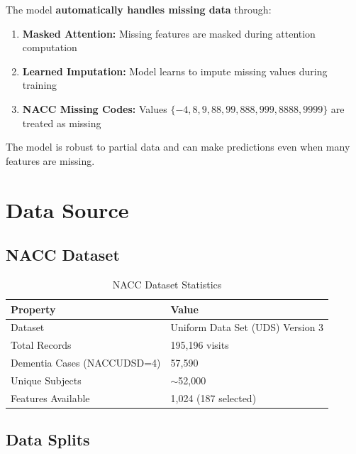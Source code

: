 \documentclass[11pt,a4paper]{article}
\begin{document}
\begin{tcolorbox}[colback=green!5!white, colframe=green!75!black, title=Automatic Missing Data Imputation]
The model \textbf{automatically handles missing data} through:
\begin{enumerate}
    \item \textbf{Masked Attention:} Missing features are masked during attention computation
    \item \textbf{Learned Imputation:} Model learns to impute missing values during training
    \item \textbf{NACC Missing Codes:} Values $\{-4, 8, 9, 88, 99, 888, 999, 8888, 9999\}$ are treated as missing
\end{enumerate}
The model is robust to partial data and can make predictions even when many features are missing.
\end{tcolorbox}

\section{Data Source}

\subsection{NACC Dataset}

\begin{table}[H]
\centering
\caption{NACC Dataset Statistics}
\label{tab:nacc}
\begin{tabular}{@{}ll@{}}
\toprule
\textbf{Property} & \textbf{Value} \\
\midrule
Dataset & Uniform Data Set (UDS) Version 3 \\
Total Records & 195,196 visits \\
Dementia Cases (NACCUDSD=4) & 57,590 \\
Unique Subjects & $\sim$52,000 \\
Features Available & 1,024 (187 selected) \\
\bottomrule
\end{tabular}
\end{table}

\subsection{Data Splits}
\end{document}
